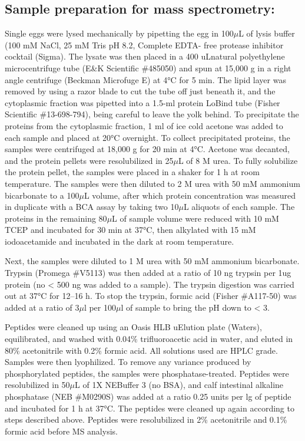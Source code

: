 \documentclass[11pt,]{article}
\begin{document}
\hypertarget{sample-preparation-for-mass-spectrometry}{%
\subsection{Sample preparation for mass
spectrometry:}\label{sample-preparation-for-mass-spectrometry}}

Single eggs were lysed mechanically by pipetting the egg in 100\(\mu\)L
of lysis buffer (100 mM NaCl, 25 mM Tris pH 8.2, Complete EDTA- free
protease inhibitor cocktail (Sigma). The lysate was then placed in a 400
uLnatural polyethylene microcentrifuge tube (E\&K Scientific \#485050)
and spun at 15,000 g in a right angle centrifuge (Beckman Microfuge E)
at 4°C for 5 min. The lipid layer was removed by using a razor blade to
cut the tube off just beneath it, and the cytoplasmic fraction was
pipetted into a 1.5-ml protein LoBind tube (Fisher Scientific
\#13-698-794), being careful to leave the yolk behind. To precipitate
the proteins from the cytoplasmic fraction, 1 ml of ice cold acetone was
added to each sample and placed at 20°C overnight. To collect
precipitated proteins, the samples were centrifuged at 18,000 g for 20
min at 4°C. Acetone was decanted, and the protein pellets were
resolubilized in 25\(\mu\)L of 8 M urea. To fully solubilize the protein
pellet, the samples were placed in a shaker for 1 h at room temperature.
The samples were then diluted to 2 M urea with 50 mM ammonium
bicarbonate to a 100\(\mu\)L volume, after which protein concentration
was measured in duplicate with a BCA assay by taking two 10\(\mu\)L
aliquots of each sample. The proteins in the remaining 80\(\mu\)L of
sample volume were reduced with 10 mM TCEP and incubated for 30 min at
37°C, then alkylated with 15 mM iodoacetamide and incubated in the dark
at room temperature.

Next, the samples were diluted to 1 M urea with 50 mM ammonium
bicarbonate. Trypsin (Promega \#V5113) was then added at a ratio of 10
ng trypsin per 1ug protein (no \textless{} 500 ng was added to a
sample). The trypsin digestion was carried out at 37°C for 12--16 h. To
stop the trypsin, formic acid (Fisher \#A117-50) was added at a ratio of
3\(\mu\)l per 100\(\mu\)l of sample to bring the pH down to \textless{}
3.

Peptides were cleaned up using an Oasis HLB uElution plate (Waters),
equilibrated, and washed with 0.04\% trifluoroacetic acid in water, and
eluted in 80\% acetonitrile with 0.2\% formic acid. All solutions used
are HPLC grade. Samples were then lyophilized. To remove any variance
produced by phosphorylated peptides, the samples were
phosphatase-treated. Peptides were resolubilized in 50\(\mu\)L of 1X
NEBuffer 3 (no BSA), and calf intestinal alkaline phosphatase (NEB
\#M0290S) was added at a ratio 0.25 units per lg of peptide and
incubated for 1 h at 37°C. The peptides were cleaned up again according
to steps described above. Peptides were resolubilized in 2\%
acetonitrile and 0.1\% formic acid before MS analysis.
\end{document}

